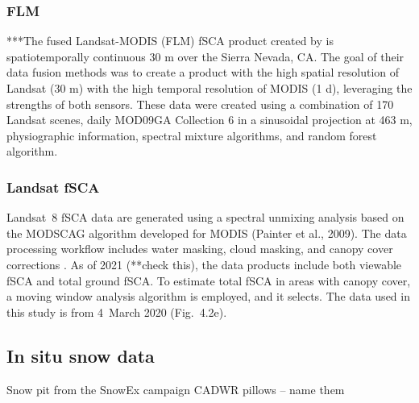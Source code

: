 \hypertarget{ch4-methods-7}{\subsubsection{FLM}\label{ch4-methods-7}}

***The fused Landsat-MODIS (FLM) fSCA product created by \cite{rittgerMultisensorFusionUsing2021} is spatiotemporally continuous 30 m over the Sierra Nevada, CA. The goal of their data fusion methods was to create a product with the high spatial resolution of Landsat (30 m) with the high temporal resolution of MODIS (1 d), leveraging the strengths of both sensors. These data were created using a combination of 170 Landsat scenes, daily MOD09GA Collection 6 in a sinusoidal projection at 463 m, physiographic information, spectral mixture algorithms, and random forest algorithm. 

\hypertarget{ch4-methods-8}{\subsubsection{Landsat fSCA}\label{ch4-methods-8}}

Landsat~8 fSCA \citep{u.s.geologicalsurveyearthresourcesobservationandsciencecenterCollection1LandsatLevel32018}  data are generated using a spectral unmixing analysis based on the MODSCAG algorithm developed for MODIS (Painter et al., 2009). The data processing workflow includes water masking, cloud masking, and canopy cover corrections \citep{selkowitzUSGSLandsatSnow2017, stillingerLandsatMODISVIIRS2023}. As of 2021 (**check this), the data products include both viewable fSCA and total ground fSCA. To estimate total fSCA in areas with canopy cover, a moving window analysis algorithm is employed, and it selects. The data used in this study is from 4~March 2020 (Fig.~4.2e).


\hypertarget{ch4-methods-8}{\subsection{In situ snow data}\label{ch4-methods-8}}

Snow pit from the SnowEx campaign
CADWR pillows -- name them

